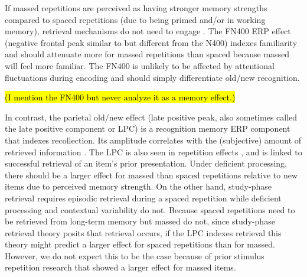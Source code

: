 If massed repetitions are perceived as having stronger memory strengths compared to spaced repetitions (due to being primed and/or in working memory), retrieval mechanisms do not need to engage \cite{Gree1989a,VanSEtal2007}.  The FN400 ERP effect (negative frontal peak similar to but different from the N400) indexes familiarity \cite{Curr2000,Meck2006,RuggCurr2007} and should attenuate more for massed repetitions than spaced because massed will feel more familiar.  The FN400 is unlikely to be affected by attentional fluctuations during encoding \cite{Curr2004} and should simply differentiate old/new recognition.

\hl{(I mention the FN400 but never analyze it as a memory effect.)}

In contrast, the parietal old/new effect (late positive peak, also sometimes called the late positive component or LPC) is a recognition memory ERP component that indexes recollection.  Its amplitude correlates with the (subjective) amount of retrieved information \cite{VilbEtal2006,Wild2000,WildRugg1996}.
The LPC is also seen in repetition effects \cite{OlicEtal2000,VanSEtal2007}, and is linked to successful retrieval of an item's prior presentation.
Under deficient processing,
there should be a larger effect for massed than spaced repetitions relative to new items due to perceived memory strength.
On the other hand, study-phase retrieval requires episodic retrieval during a spaced repetition while deficient processing and contextual variability do not.  \cbstart  Because spaced repetitions need to be retrieved from long-term memory but massed do not, since study-phase retrieval theory posits that retrieval occurs, if the LPC indexes retrieval this theory might predict a larger effect for spaced repetitions than for massed.  However, we do not expect this to be the case because of prior stimulus repetition research that showed a larger effect for massed items.
\cbend

